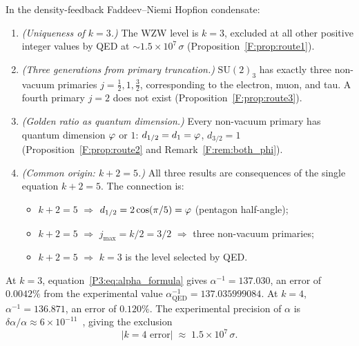 

\begin{theorem}
\label{F:thm:main}
In the density-feedback Faddeev--Niemi Hopfion condensate:

\begin{enumerate}[label=\emph{(\roman*)}]
  \item \emph{(Uniqueness of $k=3$.)}
    The WZW level is $k=3$, excluded at all other positive integer
    values by QED at $\sim1.5\times10^7\,\sigma$ (Proposition~\ref{F:prop:route1}).

  \item \emph{(Three generations from primary truncation.)}
    $\mathrm{SU}(2)_3$ has exactly three non-vacuum primaries
    $j = \tfrac{1}{2}, 1, \tfrac{3}{2}$, corresponding to the electron,
    muon, and tau.
    A fourth primary $j=2$ does not exist (Proposition~\ref{F:prop:route3}).

  \item \emph{(Golden ratio as quantum dimension.)}
    Every non-vacuum primary has quantum dimension $\varphi$ or $1$:
    $d_{1/2} = d_1 = \varphi$, $d_{3/2} = 1$ (Proposition~\ref{F:prop:route2}
    and Remark~\ref{F:rem:both_phi}).

  \item \emph{(Common origin: $k+2=5$.)}
    All three results are consequences of the single equation $k+2=5$.
    The connection is:
    \begin{itemize}
      \item $k+2=5$ $\Rightarrow$ $d_{1/2} = 2\cos(\pi/5) = \varphi$
        (pentagon half-angle);
      \item $k+2=5$ $\Rightarrow$ $j_{\max}=k/2=3/2$
        $\Rightarrow$ three non-vacuum primaries;
      \item $k+2=5$ $\Rightarrow$ $k=3$ is the level selected by QED.
    \end{itemize}
\end{enumerate}
\end{theorem}

\begin{proposition}
\label{F:prop:route1}
At $k=3$, equation~\eqref{P3:eq:alpha_formula} gives
$\alpha^{-1} = 137.030$, an error of $0.0042\%$ from the experimental
value $\alpha^{-1}_{\mathrm{QED}} = 137.035999084$.
At $k=4$, $\alpha^{-1} = 136.871$, an error of $0.120\%$.
The experimental precision of $\alpha$ is $\delta\alpha/\alpha
\approx 6\times10^{-11}$~\cite{Morel2020}, giving the exclusion
\begin{equation}
  |k=4 \text{ error}| \;\approx\; 1.5\times10^7\,\sigma.
  \label{F:eq:sigma_exclusion}
\end{equation}
\end{proposition}

